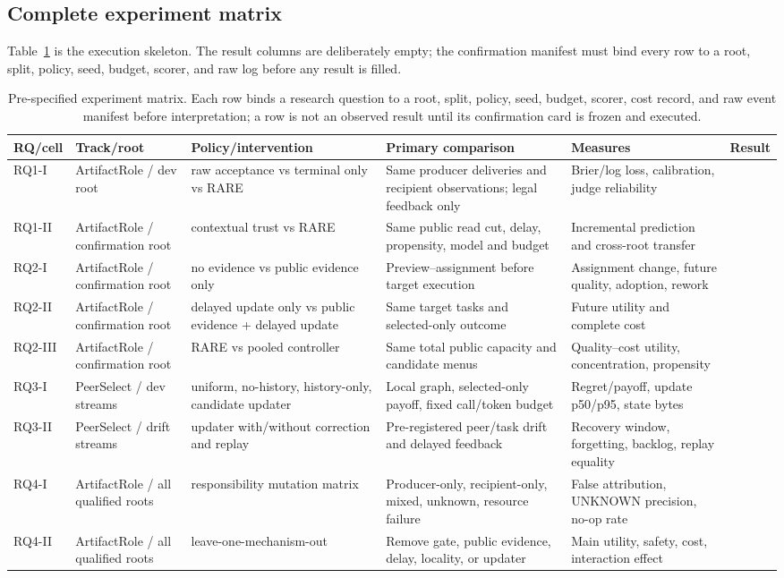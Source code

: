 \documentclass[sigconf,anonymous]{aamas}
\newcommand{\blank}{\textemdash}
\begin{document}
\subsection{Complete experiment matrix}
Table~\ref{tab:matrix} is the execution skeleton. The result columns are deliberately empty; the confirmation manifest must bind every row to a root, split, policy, seed, budget, scorer, and raw log before any result is filled.
\begin{table}[t]
\centering\scriptsize
\begin{tabular}{p{}p{}p{}p{}p{}p{}}
\toprule
RQ/cell & Track/root & Policy/intervention & Primary comparison & Measures & Result\\
\midrule
RQ1-I & ArtifactRole / dev root & raw acceptance vs terminal only vs RARE & Same producer deliveries and recipient observations; legal feedback only & Brier/log loss, calibration, judge reliability & \blank\\
RQ1-II & ArtifactRole / confirmation root & contextual trust vs RARE & Same public read cut, delay, propensity, model and budget & Incremental prediction and cross-root transfer & \blank\\
RQ2-I & ArtifactRole / confirmation root & no evidence vs public evidence only & Preview--assignment before target execution & Assignment change, future quality, adoption, rework & \blank\\
RQ2-II & ArtifactRole / confirmation root & delayed update only vs public evidence + delayed update & Same target tasks and selected-only outcome & Future utility and complete cost & \blank\\
RQ2-III & ArtifactRole / confirmation root & RARE vs pooled controller & Same total public capacity and candidate menus & Quality--cost utility, concentration, propensity & \blank\\
RQ3-I & PeerSelect / dev streams & uniform, no-history, history-only, candidate updater & Local graph, selected-only payoff, fixed call/token budget & Regret/payoff, update p50/p95, state bytes & \blank\\
RQ3-II & PeerSelect / drift streams & updater with/without correction and replay & Pre-registered peer/task drift and delayed feedback & Recovery window, forgetting, backlog, replay equality & \blank\\
RQ4-I & ArtifactRole / all qualified roots & responsibility mutation matrix & Producer-only, recipient-only, mixed, unknown, resource failure & False attribution, UNKNOWN precision, no-op rate & \blank\\
RQ4-II & ArtifactRole / all qualified roots & leave-one-mechanism-out & Remove gate, public evidence, delay, locality, or updater & Main utility, safety, cost, interaction effect & \blank\\
\bottomrule
\end{tabular}
\caption{Pre-specified experiment matrix. Each row binds a research question to a root, split, policy, seed, budget, scorer, cost record, and raw event manifest before interpretation; a row is not an observed result until its confirmation card is frozen and executed.}
\label{tab:matrix}
\end{table}
\end{document}
